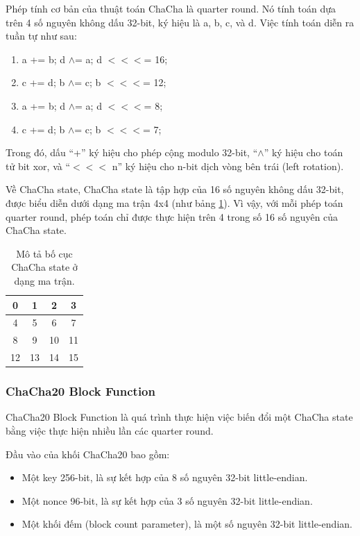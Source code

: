 Phép tính cơ bản của thuật toán ChaCha là quarter round. Nó tính toán dựa trên 4 số nguyên không dấu 32-bit, ký hiệu là a, b, c, và d. Việc tính toán diễn ra tuần tự như sau:

\begin{enumerate}
    \item a += b; d $\wedge$= a; d $<<<$= 16;
    \item c += d; b $\wedge$= c; b $<<<$= 12;
    \item a += b; d $\wedge$= a; d $<<<$= 8;
    \item c += d; b $\wedge$= c; b $<<<$= 7;
\end{enumerate}

Trong đó, dấu ``+'' ký hiệu cho phép cộng modulo 32-bit, ``$\wedge$'' ký hiệu cho toán tử bit \acrfull{xor}, và ``$<<<$ n'' ký hiệu cho n-bit dịch vòng bên trái (left rotation).

Về ChaCha state, ChaCha state là tập hợp của 16 số nguyên không dấu 32-bit, được biểu diễn dưới dạng ma trận 4x4 (như bảng \ref{tab:CC20-State-Pos}). Vì vậy, với mỗi phép toán quarter round, phép toán chỉ được thực hiện trên 4 trong số 16 số nguyên của ChaCha state.

\begin{table}[ht]
\caption{Mô tả bố cục ChaCha state ở dạng ma trận.}

\label{tab:CC20-State-Pos}%
\begin{center}
\begin{tabular}{|c|c|c|c|}
\hline
0  & 1  & 2  & 3  \\ \hline
4  & 5  & 6  & 7  \\ \hline
8  & 9  & 10 & 11 \\ \hline
12 & 13 & 14 & 15 \\ \hline
\end{tabular}
\end{center}
\end{table}

\subsubsection{ChaCha20 Block Function}

ChaCha20 Block Function là quá trình thực hiện việc biến đổi một ChaCha state bằng việc thực hiện nhiều lần các quarter round.

Đầu vào của khối ChaCha20 bao gồm:
\begin{itemize}
    \item Một key 256-bit, là sự kết hợp của 8 số nguyên 32-bit little-endian.
    \item Một nonce 96-bit, là sự kết hợp của 3 số nguyên 32-bit little-endian.
    \item Một khối đếm (block count parameter), là một số nguyên 32-bit little-endian.
\end{itemize}

